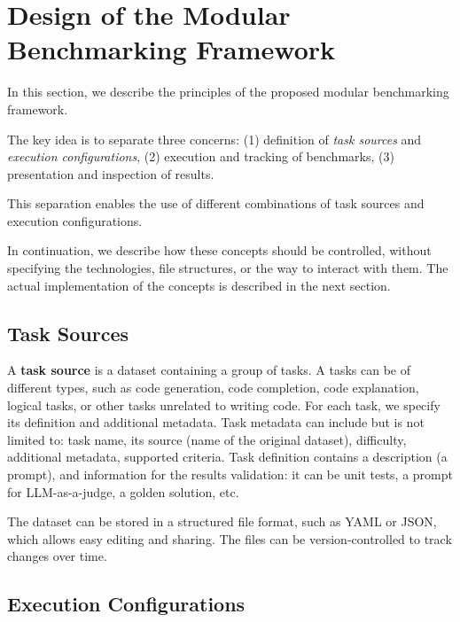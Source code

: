 \section{Design of the Modular Benchmarking Framework}

In this section, we describe the principles of the proposed modular benchmarking framework.

The key idea is to separate three concerns:
(1) definition of \textit{task sources} and \textit{execution configurations},
(2) execution and tracking of benchmarks,
(3) presentation and inspection of results.

This separation enables the use of different combinations of task sources and execution configurations.

In continuation, we describe how these concepts should be controlled, without specifying the technologies, file structures, or the way to interact with them.
The actual implementation of the concepts is described in the next section.

\subsection{Task Sources}
A \textbf{task source} is a dataset containing a group of tasks.
A tasks can be of different types, such as code generation, code completion, code explanation, logical tasks, or other tasks unrelated to writing code.
For each task, we specify its definition and additional metadata.
Task metadata can include but is not limited to: task name, its source (name of the original dataset), difficulty, additional metadata, supported criteria.
Task definition contains a description (a prompt), and information for the results validation: it can be unit tests, a prompt for LLM-as-a-judge, a golden solution, etc.

The dataset can be stored in a structured file format, such as YAML or JSON, which allows easy editing and sharing.
The files can be version-controlled to track changes over time.

\subsection{Execution Configurations}

